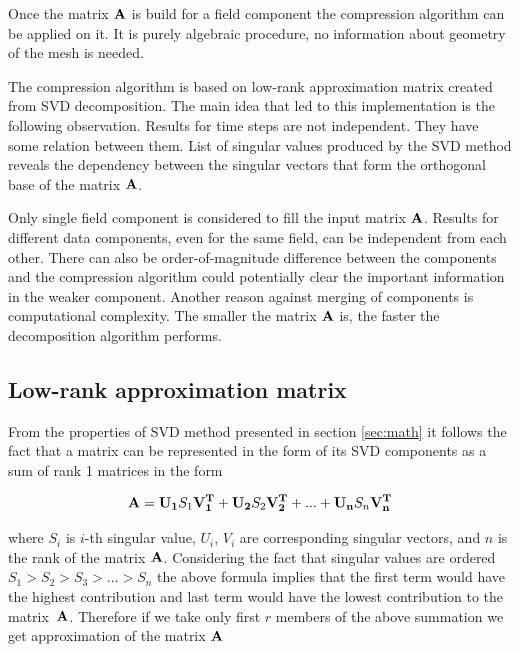 Once the matrix $\mathbf{A}$ is build for a field component the compression algorithm can be applied on it. It is purely algebraic procedure, no information about geometry of the mesh is needed.

The compression algorithm is based on low-rank approximation matrix created from SVD decomposition. The main idea that led to this implementation is the following observation. Results for time steps are not independent. They have some relation between them. List of singular values produced by the SVD method reveals the dependency between the singular vectors that form the orthogonal base of the matrix $\mathbf{A}$. 

Only single field component is considered to fill the input matrix $\mathbf{A}$. Results for different data components, even for the same field, can be independent from each other. There can also be order-of-magnitude difference between the components and the compression algorithm could potentially clear the important information in the weaker component. Another reason against merging of components is computational complexity. The smaller the matrix $\mathbf{A}$ is, the faster the decomposition algorithm performs.

\subsection{Low-rank approximation matrix}


From the properties of SVD method presented in section \ref{sec:math} it follows the fact that a matrix can be represented in the form of its SVD components as a sum of rank 1 matrices in the form

$$\mathbf{A}=\mathbf{U_{1}}S_{1}\mathbf{V_{1}^{T}}+\mathbf{U_{2}}S_{2}\mathbf{V_{2}^{T}}+ ... +\mathbf{U_{n}}S_{n}\mathbf{V_{n}^{T}}$$

where $S_{i}$ is $i$-th singular value, $U_{i}$, $V_{i}$ are corresponding singular vectors, and $n$ is the rank of the matrix $\mathbf{A}$. Considering the fact that singular values are ordered $S_{1}>S_{2}>S_{3}> ... >S_{n}$ the above formula implies that the first term would have the highest contribution and last term would have the lowest contribution to the matrix~$\mathbf{A}$. Therefore if we take only first $r$ members of the above summation we get approximation of the matrix $\mathbf{A}$

